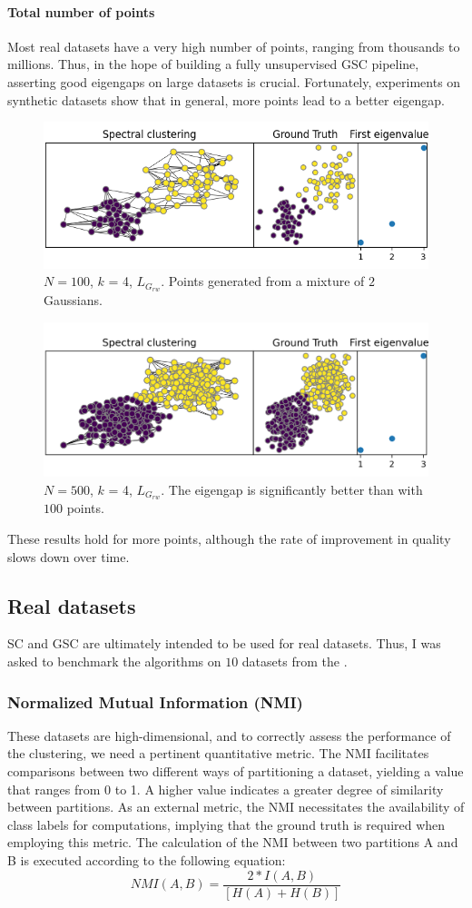\documentclass[a4paper,12pt]{article}
\theoremstyle{definition}
\theoremstyle{plain}
\begin{document}
\paragraph{Total number of points}
Most real datasets have a very high number of points, ranging from thousands to millions. Thus, in the hope of building a fully unsupervised GSC pipeline, asserting good eigengaps on large datasets is crucial.
Fortunately, experiments on synthetic datasets show that in general, more points lead to a better eigengap.
\begin{figure}[H]
	\centering
	\includegraphics[width=0.7\linewidth]{figures/circ_100_sym}
	\caption{$N=100$, $k$ = 4, $L_{G_{rw}}$. Points generated from a mixture of $2$ Gaussians.}
	\label{fig:circ_100_sym}
\end{figure}
\begin{figure}[H]
	\centering
	\includegraphics[width=0.7\linewidth]{figures/circ_500_sym}
	\caption{$N=500$, $k$ = 4, $L_{G_{rw}}$. The eigengap is significantly better than with $100$ points. }
	\label{fig:circ_500_sym}
\end{figure}
These results hold for more points, although the rate of improvement in quality slows down over time.

\newpage
\subsection{Real datasets}
SC and GSC are ultimately intended to be used for real datasets. Thus, I was asked to benchmark the algorithms on $10$ datasets from the \cite[UCI ML repository]{UCI} .


\subsubsection{Normalized Mutual Information (NMI)}
These datasets are high-dimensional, and to correctly assess the performance of the clustering, we need a pertinent quantitative metric. The NMI facilitates comparisons between two different ways of partitioning a dataset, yielding a value that ranges from 0 to 1. A higher value indicates a greater degree of similarity between partitions. As an external metric, the NMI necessitates the availability of class labels for computations, implying that the ground truth is required when employing this metric.
The calculation of the NMI between two partitions A and B is executed according to the following equation:
$$NMI\left(A,B\right)=\frac{2*I(A,B)}{[H\left(A\right)+H(B)]}$$
\end{document}
